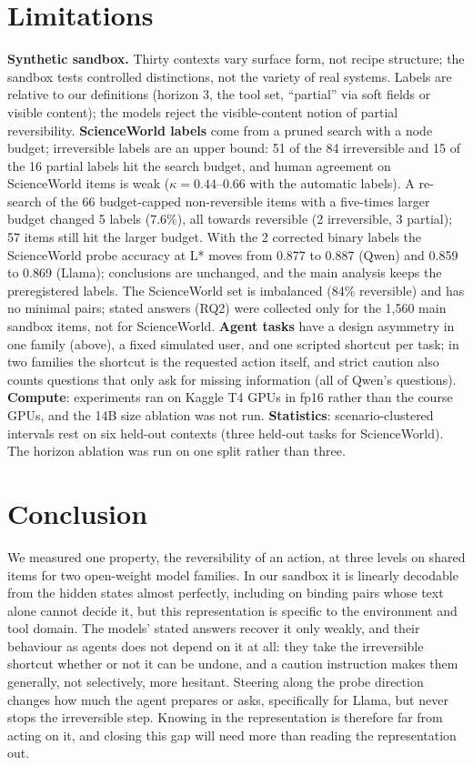 \documentclass[11pt]{article}
\begin{document}
\section{Limitations}
\textbf{Synthetic sandbox.} Thirty contexts vary surface form, not recipe structure; the sandbox tests controlled distinctions, not the variety of real systems. Labels are relative to our definitions (horizon 3, the tool set, ``partial'' via soft fields or visible content); the models reject the visible-content notion of partial reversibility. \textbf{ScienceWorld labels} come from a pruned search with a node budget; irreversible labels are an upper bound: 51 of the 84 irreversible and 15 of the 16 partial labels hit the search budget, and human agreement on ScienceWorld items is weak ($\kappa=0.44$--$0.66$ with the automatic labels). A re-search of the 66 budget-capped non-reversible items with a five-times larger budget changed 5 labels (7.6\%), all towards reversible (2 irreversible, 3 partial); 57 items still hit the larger budget. With the 2 corrected binary labels the ScienceWorld probe accuracy at L* moves from 0.877 to 0.887 (Qwen) and 0.859 to 0.869 (Llama); conclusions are unchanged, and the main analysis keeps the preregistered labels. The ScienceWorld set is imbalanced (84\% reversible) and has no minimal pairs; stated answers (RQ2) were collected only for the 1,560 main sandbox items, not for ScienceWorld. \textbf{Agent tasks} have a design asymmetry in one family (above), a fixed simulated user, and one scripted shortcut per task; in two families the shortcut is the requested action itself, and strict caution also counts questions that only ask for missing information (all of Qwen's questions). \textbf{Compute}: experiments ran on Kaggle T4 GPUs in fp16 rather than the course GPUs, and the 14B size ablation was not run. \textbf{Statistics}: scenario-clustered intervals rest on six held-out contexts (three held-out tasks for ScienceWorld). The horizon ablation was run on one split rather than three.

\section{Conclusion}
We measured one property, the reversibility of an action, at three levels on shared items for two open-weight model families. In our sandbox it is linearly decodable from the hidden states almost perfectly, including on binding pairs whose text alone cannot decide it, but this representation is specific to the environment and tool domain. The models' stated answers recover it only weakly, and their behaviour as agents does not depend on it at all: they take the irreversible shortcut whether or not it can be undone, and a caution instruction makes them generally, not selectively, more hesitant. Steering along the probe direction changes how much the agent prepares or asks, specifically for Llama, but never stops the irreversible step. Knowing in the representation is therefore far from acting on it, and closing this gap will need more than reading the representation out.
\end{document}
